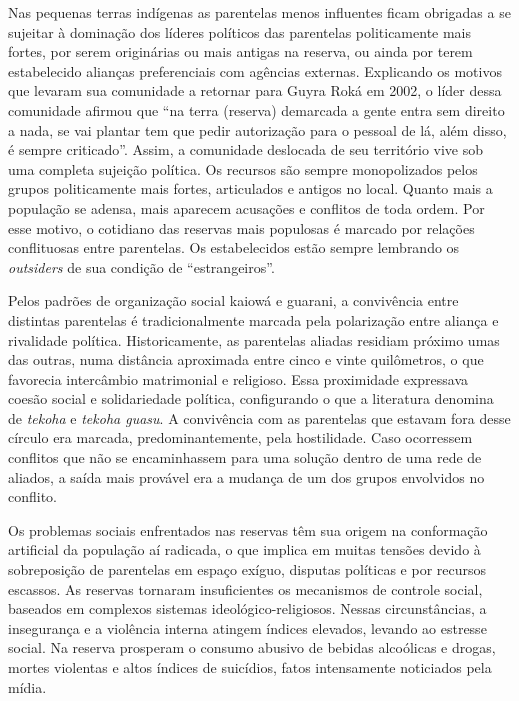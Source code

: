 Nas pequenas terras indígenas as parentelas menos influentes ficam
obrigadas a se sujeitar à dominação dos líderes políticos das parentelas
politicamente mais fortes, por serem originárias ou mais antigas na
reserva, ou ainda por terem estabelecido alianças preferenciais com
agências externas. Explicando os motivos que levaram sua comunidade a
retornar para Guyra Roká em 2002, o líder dessa comunidade afirmou que
``na terra (reserva) demarcada a gente entra sem direito a nada, se vai
plantar tem que pedir autorização para o pessoal de lá, além disso, é
sempre criticado''. Assim, a comunidade deslocada de seu território vive
sob uma completa sujeição política. Os recursos são sempre monopolizados
pelos grupos politicamente mais fortes, articulados e antigos no local.
Quanto mais a população se adensa, mais aparecem acusações e conflitos
de toda ordem. Por esse motivo, o cotidiano das reservas mais populosas
é marcado por relações conflituosas entre parentelas. Os estabelecidos
estão sempre lembrando os \emph{outsiders} de sua condição de
``estrangeiros''.

Pelos padrões de organização social kaiowá e guarani, a convivência
entre distintas parentelas é tradicionalmente marcada pela polarização
entre aliança e rivalidade política. Historicamente, as parentelas
aliadas residiam próximo umas das outras, numa distância aproximada
entre cinco e vinte quilômetros, o que favorecia intercâmbio matrimonial
e religioso. Essa proximidade expressava coesão social e solidariedade
política, configurando o que a literatura denomina de \emph{tekoha} e
\emph{tekoha guasu}. A convivência com as parentelas que estavam fora
desse círculo era marcada, predominantemente, pela hostilidade. Caso
ocorressem conflitos que não se encaminhassem para uma solução dentro de
uma rede de aliados, a saída mais provável era a mudança de um dos
grupos envolvidos no conflito.

Os problemas sociais enfrentados nas reservas têm sua origem na
conformação artificial da população aí radicada, o que implica em muitas
tensões devido à sobreposição de parentelas em espaço exíguo, disputas
políticas e por recursos escassos. As reservas tornaram insuficientes os
mecanismos de controle social, baseados em complexos sistemas
ideológico-religiosos. Nessas circunstâncias, a insegurança e a
violência interna atingem índices elevados, levando ao estresse social.
Na reserva prosperam o consumo abusivo de bebidas alcoólicas e drogas,
mortes violentas e altos índices de suicídios, fatos intensamente
noticiados pela mídia.

